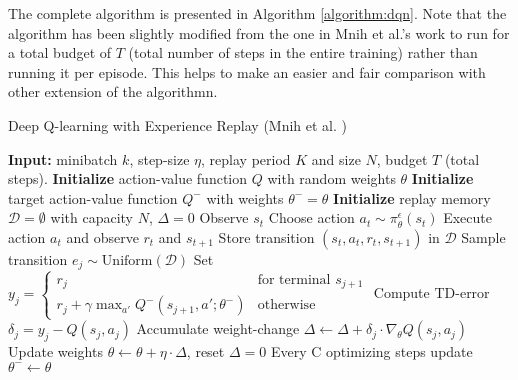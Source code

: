 The complete algorithm is presented in Algorithm \ref{algorithm:dqn}. Note that the algorithm has been slightly modified from the one in Mnih et al.'s work \cite{mnih2013playing, mnih2015human} to run for a total budget of $T$ (total number of steps in the entire training) rather than running it per episode. This helps to make an easier and fair comparison with other extension of the algorithmn.




\begin{algorithm}
\caption{Deep Q-learning with Experience Replay (Mnih et al. \cite{mnih2013playing, mnih2015human})}
\label{algorithm:dqn}
\begin{algorithmic}[1]
\State \textbf{Input:} minibatch $k$, step-size $\eta$, replay period $K$ and size $N$, budget $T$ (total steps).
\State \textbf{Initialize} action-value function $Q$ with random weights $\theta$
\State \textbf{Initialize} target action-value function $Q^-$ with weights $\theta^- = \theta$
\State \textbf{Initialize} replay memory $\mathcal{D} = \emptyset$ with capacity $N$, $\Delta = 0$
    \State Observe $s_t$
    \State Choose action $a_t \sim \pi^\epsilon_\theta(s_t)$
    \State Execute action $a_t$ and observe $r_t$ and $s_{t+1}$
    \State Store transition $(s_t, a_t, r_t, s_{t+1})$ in $\mathcal{D}$
            \State Sample transition $e_j \sim \text{Uniform}(\mathcal{D})$
            \State Set $y_j = 
            \begin{cases} 
                r_j & \text{for terminal } s_{j+1}\\
                r_j + \gamma \max_{a'} Q^-(s_{j+1}, a'; \theta^-) & \text{otherwise}
            \end{cases}$
            \State Compute TD-error $\delta_j = y_j - Q(s_j, a_j)$
            \State Accumulate weight-change $\Delta \leftarrow \Delta + \delta_j \cdot \nabla_\theta Q(s_j, a_j)$
        \EndFor
        \State Update weights $\theta \leftarrow \theta + \eta \cdot \Delta$, reset $\Delta = 0$
        \State Every C optimizing steps update $\theta^- \leftarrow \theta$
    \EndIf
\EndFor
\end{algorithmic}
\end{algorithm}


